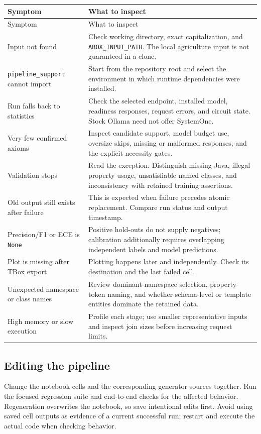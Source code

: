 \documentclass[11pt,a4paper]{article}
\newcommand{\code}[1]{\nolinkurl{#1}}
\begin{document}
\begin{longtable}{@{}P{44mm}P{111mm}@{}}
\toprule
Symptom & What to inspect \\
\midrule
\endfirsthead
\toprule Symptom & What to inspect \\ \midrule
\endhead
Input not found & Check working directory, exact capitalization, and \code{ABOX_INPUT_PATH}. The local agriculture input is not guaranteed in a clone. \\
\code{pipeline_support} cannot import & Start from the repository root and select the environment in which runtime dependencies were installed. \\
Run falls back to statistics & Check the selected endpoint, installed model, readiness responses, request errors, and circuit state. Stock Ollama need not offer SystemOne. \\
Very few confirmed axioms & Inspect candidate support, model budget use, oversize skips, missing or malformed responses, and the explicit necessity gates. \\
Validation stops & Read the exception. Distinguish missing Java, illegal property usage, unsatisfiable named classes, and inconsistency with retained training assertions. \\
Old output still exists after failure & This is expected when failure precedes atomic replacement. Compare run status and output timestamp. \\
Precision/F1 or ECE is \code{None} & Positive hold-outs do not supply negatives; calibration additionally requires overlapping independent labels and model predictions. \\
Plot is missing after TBox export & Plotting happens later and independently. Check its destination and the last failed cell. \\
Unexpected namespace or class names & Review dominant-namespace selection, property-token naming, and whether schema-level or template entities dominate the retained data. \\
High memory or slow execution & Profile each stage; use smaller representative inputs and inspect join sizes before increasing request limits. \\
\bottomrule
\end{longtable}

\subsection{Editing the pipeline}
Change the notebook cells and the corresponding generator sources together.
Run the focused regression suite and end-to-end checks for the affected behavior.
Regeneration overwrites the notebook, so save intentional edits first. Avoid
using saved cell outputs as evidence of a current successful run; restart and
execute the actual code when checking behavior.
\end{document}
